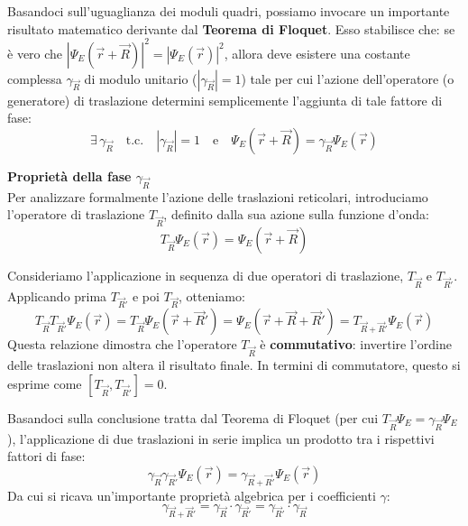 Basandoci sull'uguaglianza dei moduli quadri, possiamo invocare un importante risultato matematico derivante dal \textbf{Teorema di Floquet}. Esso stabilisce che:
se è vero che \(|\Psi_E(\vec{r} + \vec{R})|^2 = |\Psi_E(\vec{r})|^2\), allora deve esistere una costante complessa \(\gamma_{\vec{R}}\) di modulo unitario (\(|\gamma_{\vec{R}}| = 1\)) tale per cui l'azione dell'operatore (o generatore) di traslazione determini semplicemente l'aggiunta di tale fattore di fase:
\begin{equation}
    \exists \, \gamma_{\vec{R}} \quad \text{t.c.} \quad |\gamma_{\vec{R}}| = 1 \quad \text{e} \quad \Psi_E(\vec{r} + \vec{R}) = \gamma_{\vec{R}} \Psi_E(\vec{r})
\end{equation}

\textbf{Proprietà della fase \(\gamma_{\vec{R}}\)} \\
Per analizzare formalmente l'azione delle traslazioni reticolari, introduciamo l'operatore di traslazione \(T_{\vec{R}}\), definito dalla sua azione sulla funzione d'onda:
\begin{equation}
    T_{\vec{R}} \Psi_E(\vec{r}) = \Psi_E(\vec{r} + \vec{R})
\end{equation}

Consideriamo l'applicazione in sequenza di due operatori di traslazione, \(T_{\vec{R}}\) e \(T_{\vec{R}'}\). Applicando prima \(T_{\vec{R}'}\) e poi \(T_{\vec{R}}\), otteniamo:
\begin{equation}
    T_{\vec{R}} T_{\vec{R}'} \Psi_E(\vec{r}) = T_{\vec{R}} \Psi_E(\vec{r} + \vec{R}') = \Psi_E(\vec{r} + \vec{R} + \vec{R}') = T_{\vec{R}+\vec{R}'} \Psi_E(\vec{r})
\end{equation}
Questa relazione dimostra che l'operatore \(T_{\vec{R}}\) è \textbf{commutativo}: invertire l'ordine delle traslazioni non altera il risultato finale. In termini di commutatore, questo si esprime come \([T_{\vec{R}}, T_{\vec{R}'}] = 0\).

Basandoci sulla conclusione tratta dal Teorema di Floquet (per cui \(T_{\vec{R}} \Psi_E = \gamma_{\vec{R}} \Psi_E\)), l'applicazione di due traslazioni in serie implica un prodotto tra i rispettivi fattori di fase:
\begin{equation}
    \gamma_{\vec{R}} \gamma_{\vec{R}'} \Psi_E(\vec{r}) = \gamma_{\vec{R}+\vec{R}'} \Psi_E(\vec{r})
\end{equation}
Da cui si ricava un'importante proprietà algebrica per i coefficienti \(\gamma\):
\begin{equation}
    \gamma_{\vec{R}+\vec{R}'} = \gamma_{\vec{R}} \cdot \gamma_{\vec{R}'} = \gamma_{\vec{R}'} \cdot \gamma_{\vec{R}}
\end{equation}

